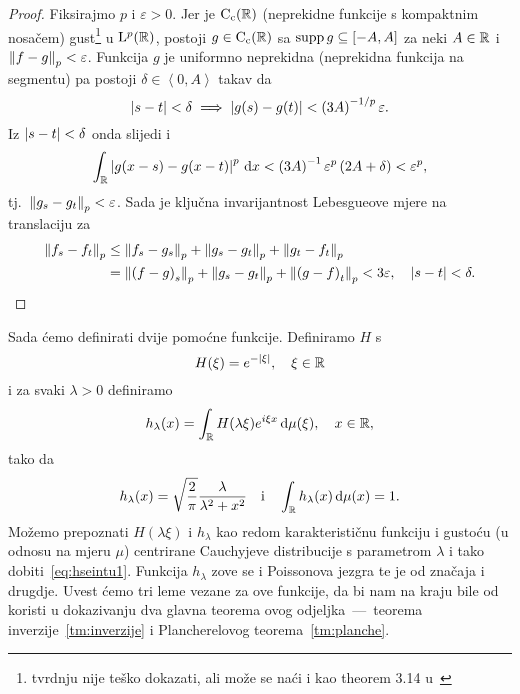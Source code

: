 \documentclass[main.tex]{subfiles}
\begin{document}
\begin{proof}
	Fiksirajmo \( p \) i \( \varepsilon > 0 \). Jer je \( \mathrm{C}_{\mathrm{c}}(\mathbb{R}) \) (neprekidne funkcije s kompaktnim nosačem)
	gust\footnote{tvrdnju nije teško dokazati, ali može se naći i kao theorem 3.14 u~\cite{rudin}} u \( \mathrm{L}^p(\mathbb{R}) \), postoji \( g \in \mathrm{C}_{\mathrm{c}}(\mathbb{R}) \) sa \( \operatorname{supp} g \subseteq \left[ -A, A \right] \)
	za neki \( A \in \mathbb{R} \) i \( \left\lVert f-g\right\rVert_p < \varepsilon \). Funkcija \( g \)
	je uniformno neprekidna (neprekidna funkcija na segmentu) pa postoji \( \delta \in \left\langle0,A\right\rangle \) takav da
	\begin{equation}
		\left| {s-t} \right| < \delta \implies \left| {g(s)-g(t)} \right| < \left( 3A \right)^{-1/p} \varepsilon.
	\end{equation}
	Iz \( \left| {s-t} \right| < \delta \) onda slijedi i
	\begin{equation}
		\int_{\mathbb{R}} \left| {g(x-s)-g(x-t)} \right|^p \,\mathrm d x < \left( 3A \right)^{-1}\varepsilon^p
		\left( 2A + \delta \right) < \varepsilon^p,
	\end{equation}
	tj.\ \( \left\lVert g_s-g_t\right\rVert_p < \varepsilon \). Sada je ključna invarijantnost
	Lebesgueove mjere na translaciju za
	\begin{equation}
		\begin{aligned}
			\left\lVert f_s-f_t\right\rVert_p & \le \left\lVert f_s-g_s\right\rVert_p + \left\lVert g_s-g_t\right\rVert_p + \left\lVert g_t-f_t\right\rVert_p                                         \\
			                 & = \left\lVert\left( f-g \right)_s\right\rVert_p + \left\lVert g_s-g_t\right\rVert_p + \left\lVert\left( g-f \right)_t\right\rVert_p < 3\varepsilon,
			\quad \left| {s-t} \right|<\delta.
		\end{aligned}
	\end{equation}
\end{proof}

Sada ćemo definirati dvije pomoćne funkcije. Definiramo \( H \) s
\begin{equation}
	H(\xi) = e^{-\left| {\xi} \right|}, \quad \xi \in \mathbb{R}
\end{equation}
i za svaki \( \lambda > 0 \) definiramo
\begin{equation}
	h_\lambda(x) = \int_{\mathbb{R}} H(\lambda \xi) e^{i\xi x} \,\mathrm d \mu(\xi), \quad x \in \mathbb{R},
\end{equation}
tako da
\begin{equation} \label{eq:hseintu1}
	h_\lambda(x) = \sqrt{\frac 2\pi} \frac \lambda{\lambda^2 + x^2}
	\quad \mathrm i \quad
	\int_{\mathbb{R}} h_\lambda(x) \,\mathrm d \mu(x) = 1.
\end{equation}
Možemo prepoznati \( H(\lambda \xi) \) i
\( h_\lambda \) kao redom karakterističnu funkciju i gustoću (u odnosu na mjeru \( \mu \))
centrirane Cauchyjeve distribucije s parametrom \( \lambda \) i tako dobiti~\eqref{eq:hseintu1}.
Funkcija \( h_\lambda \) zove se i Poissonova jezgra te je od značaja i drugdje.
Uvest ćemo tri
leme vezane za ove funkcije, da bi nam na kraju bile od koristi
u dokazivanju dva glavna teorema ovog odjeljka~---~teorema
inverzije~\ref{tm:inverzije} i Plancherelovog teorema~\ref{tm:planche}.
\end{document}
